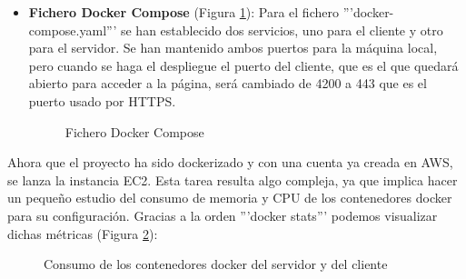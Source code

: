 \begin{itemize}
    \item\textbf{Fichero Docker Compose} (Figura \ref{fig:docker-compose}): Para el fichero '''docker-compose.yaml''' se han establecido dos servicios, uno para el cliente y otro para el servidor. Se han mantenido ambos puertos para la máquina local, pero cuando se haga el despliegue el puerto del cliente, que es el que quedará abierto para acceder a la página, será cambiado de 4200 a 443 que es el puerto usado por HTTPS.

    \begin{figure}[H]
        \caption{Fichero Docker Compose}
        \label{fig:docker-compose}
    \end{figure}
\end{itemize}


Ahora que el proyecto ha sido dockerizado y con una cuenta ya creada en AWS, se lanza la instancia EC2. Esta tarea resulta algo compleja, ya que implica hacer un pequeño estudio del consumo de memoria y CPU de los contenedores docker para su configuración. Gracias a la orden '''docker stats''' podemos visualizar dichas métricas (Figura \ref{fig:docker-stats}):

    \begin{figure}[H]
        \caption{Consumo de los contenedores docker del servidor y del cliente}
        \label{fig:docker-stats}
    \end{figure}

